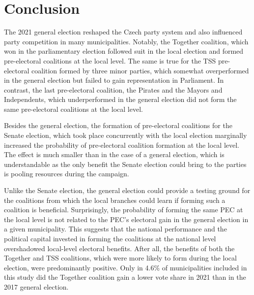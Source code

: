 \documentclass[]{interact}
\theoremstyle{plain}%
\theoremstyle{definition}
\theoremstyle{remark}
\begin{document}
\section{Conclusion}

The 2021 general election reshaped the Czech party system and also influenced party competition in many municipalities. Notably, the Together coalition, which won in the parliamentary election followed suit in the local election and formed pre-electoral coalitions at the local level. The same is true for the TSS pre-electoral coalition formed by three minor parties, which somewhat overperformed in the general election but failed to gain representation in Parliament. In contrast, the last pre-electoral coalition, the Pirates and the Mayors and Independents, which underperformed in the general election did not form the same pre-electoral coalitions at the local level. 

Besides the general election, the formation of pre-electoral coalitions for the Senate election, which took place concurrently with the local election marginally increased the probability of pre-electoral coalition formation at the local level. The effect is much smaller than in the case of a general election, which is understandable as the only benefit the Senate election could bring to the parties is pooling resources during the campaign.

Unlike the Senate election, the general election could provide a testing ground for the coalitions from which the local branches could learn if forming such a coalition is beneficial. Surprisingly, the probability of forming the same PEC at the local level is not related to the PEC's electoral gain in the general election in a given municipality. This suggests that the national performance and the political capital invested in forming the coalitions at the national level overshadowed local-level electoral benefits. After all, the benefits of both the Together and TSS coalitions, which were more likely to form during the local election, were predominantly positive. Only in 4.6\% of municipalities included in this study did the Together coalition gain a lower vote share in 2021 than in the 2017 general election. 
\end{document}
